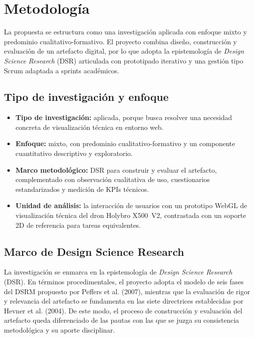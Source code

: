 \section{Metodolog\'ia}

La propuesta se estructura como una investigaci\'on aplicada con enfoque mixto y predominio cualitativo-formativo. El proyecto combina dise\~no, construcci\'on y evaluaci\'on de un artefacto digital, por lo que adopta la epistemolog\'ia de \textit{Design Science Research} (DSR) articulada con prototipado iterativo y una gesti\'on tipo Scrum adaptada a sprints acad\'emicos.

\subsection{Tipo de investigaci\'on y enfoque}

\begin{itemize}
    \item \textbf{Tipo de investigaci\'on:} aplicada, porque busca resolver una necesidad concreta de visualizaci\'on t\'ecnica en entorno web.
    \item \textbf{Enfoque:} mixto, con predominio cualitativo-formativo y un componente cuantitativo descriptivo y exploratorio.
    \item \textbf{Marco metodol\'ogico:} DSR para construir y evaluar el artefacto, complementado con observaci\'on cualitativa de uso, cuestionarios estandarizados y medici\'on de KPIs t\'ecnicos.
    \item \textbf{Unidad de an\'alisis:} la interacci\'on de usuarios con un prototipo WebGL de visualizaci\'on t\'ecnica del dron Holybro X500~V2, contrastada con un soporte 2D de referencia para tareas equivalentes.
\end{itemize}

\subsection{Marco de Design Science Research}

La investigaci\'on se enmarca en la epistemolog\'ia de \textit{Design Science Research} (DSR). En t\'erminos procedimentales, el proyecto adopta el modelo de seis fases del DSRM propuesto por Peffers et al. (2007), mientras que la evaluaci\'on de rigor y relevancia del artefacto se fundamenta en las siete directrices establecidas por Hevner et al. (2004). De este modo, el proceso de construcci\'on y evaluaci\'on del artefacto queda diferenciado de las pautas con las que se juzga su consistencia metodol\'ogica y su aporte disciplinar.

